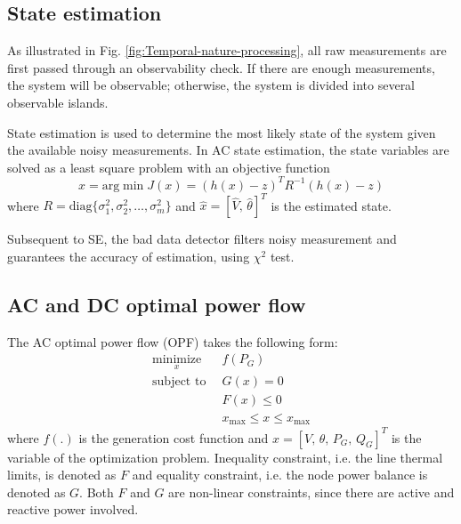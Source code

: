 \documentclass[twocolumn,english,final,journal]{IEEEtran}
\theoremstyle{plain}
\theoremstyle{definition}
\begin{document}
\subsection{State estimation \label{sub:State-estimation}}

As illustrated in Fig. \ref{fig:Temporal-nature-processing}, all
raw measurements are first passed through an observability check.
If there are enough measurements, the system will be observable; otherwise,
the system is divided into several observable islands.

State estimation is used to determine the most likely state of the
system given the available noisy measurements. In AC state estimation,
the state variables are solved as a least square problem with an objective
function 
\begin{equation}
\hat{x}=\mbox{arg}\min J(x)=(h(x)-z)^{T}R^{-1}(h(x)-z)\label{eq:LSP_obj}
\end{equation}
where $R=\mbox{diag}\{\sigma_{1}^{2},\sigma_{2}^{2},\ldots,\sigma_{m}^{2}\}$
and $\hat{x}=[\hat{V}\mbox{, }\hat{\theta}]^{T}$ is the estimated
state.

Subsequent to SE, the bad data detector filters noisy measurement and guarantees the
accuracy of estimation, using $\chi^{2}$ test.
\subsection{AC and DC optimal power flow}

The AC optimal power flow (OPF) takes the following form:
\begin{align}
\underset{x}{\mbox{minimize}}\:\:\; & f(P_{G})\nonumber \\
\mbox{subject to}\:\; & G(x)=0\label{eq:OPF_eq}\\
 & F(x)\leq0\label{eq:OPF_ineq}\\
 & x_{\max}\leq x\leq x_{\max}\label{eq:var_ValueRange-AC}
\end{align}
 where $f(.)$ is the generation cost function and $x=[V\mbox{, }\theta\mbox{, }P_{G}\mbox{, }Q_{G}]^{T}$ is the  variable of the optimization problem. Inequality constraint,
i.e. the line thermal limits, is denoted as $F$ and equality constraint,
i.e. the node power balance is denoted as $G$. Both $F$ and $G$
are non-linear constraints, since there are active and reactive power
involved.
\end{document}
